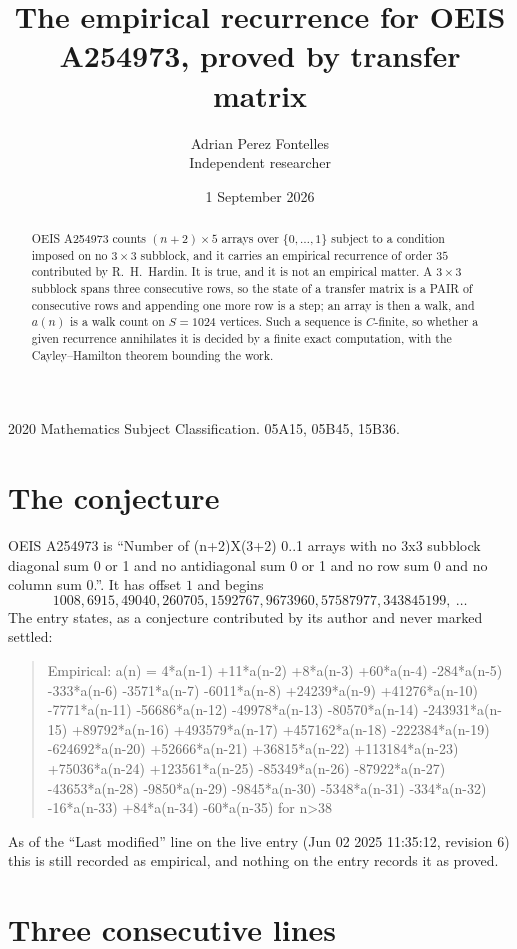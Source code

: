 \documentclass[11pt,a4paper]{article}
\title{The empirical recurrence for OEIS A254973, proved by transfer matrix}
\author{Adrian Perez Fontelles\\ \small Independent researcher}
\date{1 September 2026}
\theoremstyle{plain}
\theoremstyle{definition}
\begin{document}
\maketitle

\begin{abstract}
OEIS A254973 counts $(n+2)\times5$ arrays over $\{0,\dots,1\}$ subject to a condition imposed on
no $3\times3$ subblock, and it carries an empirical recurrence of order $35$
contributed by R.~H.~Hardin. It is true, and it is not an empirical matter. A $3\times3$
subblock spans three consecutive rows, so the state of a transfer matrix is a PAIR of
consecutive rows and appending one more row is a step; an array is then a walk, and
$a(n)$ is a walk count on $S=1024$ vertices. Such a sequence is $C$-finite, so whether a given
recurrence annihilates it is decided by a finite exact computation, with the Cayley--Hamilton
theorem bounding the work.
\end{abstract}

\noindent\small 2020 Mathematics Subject Classification. 05A15, 05B45, 15B36.\normalsize

\section{The conjecture}

OEIS A254973 is ``Number of (n+2)X(3+2) 0..1 arrays with no 3x3 subblock diagonal sum 0 or 1 and no antidiagonal sum 0 or 1 and no row sum 0 and no column sum 0.''. It has offset $1$ and begins
\[
1008, 6915, 49040, 260705, 1592767, 9673960, 57587977, 343845199,\ \dots
\]
The entry states, as a conjecture contributed by its author and never marked settled:
\begin{quote}
Empirical: a(n) = 4*a(n-1) +11*a(n-2) +8*a(n-3) +60*a(n-4) -284*a(n-5) -333*a(n-6) -3571*a(n-7) -6011*a(n-8) +24239*a(n-9) +41276*a(n-10) -7771*a(n-11) -56686*a(n-12) -49978*a(n-13) -80570*a(n-14) -243931*a(n-15) +89792*a(n-16) +493579*a(n-17) +457162*a(n-18) -222384*a(n-19) -624692*a(n-20) +52666*a(n-21) +36815*a(n-22) +113184*a(n-23) +75036*a(n-24) +123561*a(n-25) -85349*a(n-26) -87922*a(n-27) -43653*a(n-28) -9850*a(n-29) -9845*a(n-30) -5348*a(n-31) -334*a(n-32) -16*a(n-33) +84*a(n-34) -60*a(n-35) for n>38
\end{quote}
As of the ``Last modified'' line on the live entry (Jun 02 2025 11:35:12, revision 6) this is still
recorded as empirical, and nothing on the entry records it as proved.

\section{Three consecutive lines}
\end{document}
